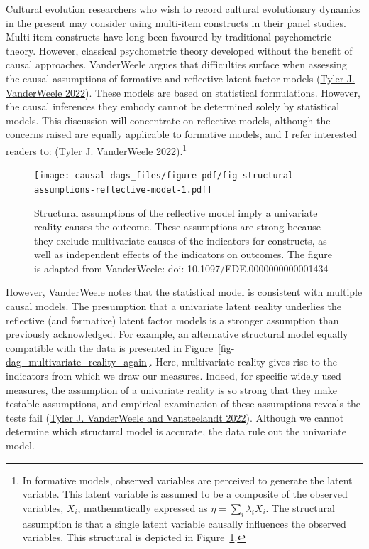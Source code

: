 \documentclass[
  singlecolumn]{article}
\begin{document}
Cultural evolution researchers who wish to record cultural evolutionary
dynamics in the present may consider using multi-item constructs in
their panel studies. Multi-item constructs have long been favoured by
traditional psychometric theory. However, classical psychometric theory
developed without the benefit of causal approaches. VanderWeele argues
that difficulties surface when assessing the causal assumptions of
formative and reflective latent factor models
(\protect\hyperlink{ref-vanderweele2022}{Tyler J. VanderWeele 2022}).
These models are based on statistical formulations. However, the causal
inferences they embody cannot be determined solely by statistical
models. This discussion will concentrate on reflective models, although
the concerns raised are equally applicable to formative models, and I
refer interested readers to:
(\protect\hyperlink{ref-vanderweele2022}{Tyler J. VanderWeele
2022}).\footnote{In formative models, observed variables are perceived
  to generate the latent variable. This latent variable is assumed to be
  a composite of the observed variables, \(X_i\), mathematically
  expressed as \(\eta = \sum_i\lambda_i X_i\). The structural assumption
  is that a single latent variable causally influences the observed
  variables. This structural is depicted in
  Figure~\ref{fig-structural-assumptions-reflective-model}.}

\begin{figure}

{\centering \texttt{[image: causal-dags\_files/figure-pdf/fig-structural-assumptions-reflective-model-1.pdf]}

}

\caption{\label{fig-structural-assumptions-reflective-model}Structural
assumptions of the reflective model imply a univariate reality causes
the outcome. These assumptions are strong because they exclude
multivariate causes of the indicators for constructs, as well as
independent effects of the indicators on outcomes. The figure is adapted
from VanderWeele: doi: 10.1097/EDE.0000000000001434}

\end{figure}

However, VanderWeele notes that the statistical model is consistent with
multiple causal models. The presumption that a univariate latent reality
underlies the reflective (and formative) latent factor models is a
stronger assumption than previously acknowledged. For example, an
alternative structural model equally compatible with the data is
presented in Figure~\ref{fig-dag_multivariate_reality_again}. Here,
multivariate reality gives rise to the indicators from which we draw our
measures. Indeed, for specific widely used measures, the assumption of a
univariate reality is so strong that they make testable assumptions, and
empirical examination of these assumptions reveals the tests fail
(\protect\hyperlink{ref-vanderweele2022b}{Tyler J. VanderWeele and
Vansteelandt 2022}). Although we cannot determine which structural model
is accurate, the data rule out the univariate model.
\end{document}

